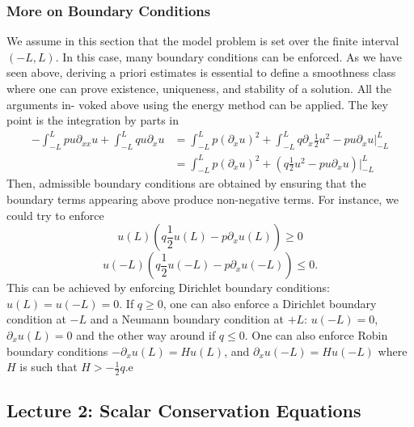 \documentclass{article}
\theoremstyle{definition}
\theoremstyle{definition}
\begin{document}
\subsubsection{More on Boundary Conditions}
We assume in this section that the model problem is set over the finite interval
$(-L,L).$ In this case, many boundary conditions can be enforced. As we have seen
above, deriving a priori estimates is essential to define a smoothness class where one
can prove existence, uniqueness, and stability of a solution. All the arguments in-
voked above using the energy method can be applied. The key point is the integration by parts in
\begin{align*}
    -\int_{-L}^{L}pu\partial_{xx}u+\int_{-L}^{L}qu\partial_{x}u &=\int_{-L}^{L}p(\partial_{x}u)^2+\int_{-L}^{L}q\partial_{x}\frac{1}{2}u^2-pu\partial_{x}u\Big|_{-L}^{L} \\
    &=\int_{-L}^{L}p(\partial_{x}u)^2+(q\frac{1}{2}u^2-pu\partial_{x}u)\Big|_{-L}^{L}
\end{align*}
Then, admissible boundary conditions are obtained by ensuring that the boundary
terms appearing above produce non-negative terms. For instance, we could try to
enforce
$$u(L)\left(q\frac{1}{2}u(L)-p\partial_{x}u(L)\right)\geq 0$$
$$u(-L)\left(q\frac{1}{2}u(-L)-p\partial_{x}u(-L)\right)\leq 0.$$
This can be achieved by enforcing Dirichlet boundary conditions:
$u(L)=u(-L)=0$.
If $q \geq 0$, one can also enforce a Dirichlet boundary condition at $-L$ and a Neumann
boundary condition at $+L$: $u(-L)=0$, $\partial_{x}u(L)=0$ and the other way around if $q\leq 0$. One can also enforce Robin boundary conditions
$-\partial_{x}u(L)=Hu(L)$, and $\partial_{x}u(-L)=Hu(-L)$ where $H$ is such that $H>-\frac{1}{2}q$.e

\subsection{Lecture 2: Scalar Conservation Equations}
\end{document}
